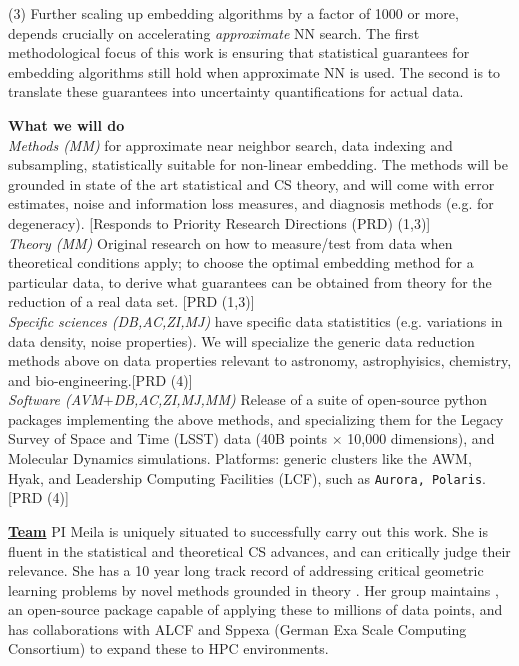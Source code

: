 \documentclass[floatfix,11pt]{article}
\begin{document}
(3) Further scaling up embedding algorithms by a factor of 1000 or more, depends crucially on accelerating {\em approximate} NN \cite{charikarKapralovNouriSiminelakis:kde20} search. The first methodological focus of this work is ensuring that statistical guarantees for embedding algorithms still hold when approximate NN is used. The second is to translate these guarantees into uncertainty quantifications for actual data. 

\textbf{What we will do}
\\
{\em Methods (MM)} for approximate near neighbor search, data indexing and subsampling, statistically suitable for non-linear embedding. The methods will be grounded in state of the art statistical and CS theory, and will come with error estimates, noise and information loss measures, and diagnosis methods (e.g. for degeneracy). [Responds to Priority Research Directions (PRD) (1,3)]\\
{\em Theory (MM)}  Original research on how to measure/test from data when theoretical conditions apply; to choose the optimal embedding method for a particular data, to derive what guarantees can be obtained from theory for the reduction of a real data set. [PRD (1,3)]
 \\
{\em Specific sciences (DB,AC,ZI,MJ)} have specific data statistitics (e.g. variations in data density, noise properties). We will specialize the generic data reduction methods above on data properties relevant to astronomy, astrophyisics, chemistry, and bio-engineering.[PRD (4)]\\
{\em Software (AVM$+$DB,AC,ZI,MJ,MM)} Release of a suite of open-source python packages implementing the above methods, and specializing them for the Legacy Survey of Space and Time (LSST) data (40B points $\times$ 10,000 dimensions), and Molecular Dynamics simulations. 
Platforms: generic clusters like the AWM, Hyak, and Leadership Computing Facilities (LCF), such as {\tt Aurora, Polaris}. [PRD (4)]

\underline{\bf Team} %
PI Meila is uniquely situated to successfully carry out this work. She is fluent in the statistical and theoretical CS advances, and can critically judge their relevance. She has a 10 year long track record of addressing critical geometric learning problems by novel methods grounded in theory \citep{2013arXiv1305.7255P,MChen:ies-neurips19}. Her group maintains \mmani, an open-source package capable of applying these to millions of data points, and has collaborations with ALCF and Sppexa (German Exa Scale Computing Consortium) to expand these to HPC environments.
\end{document}
